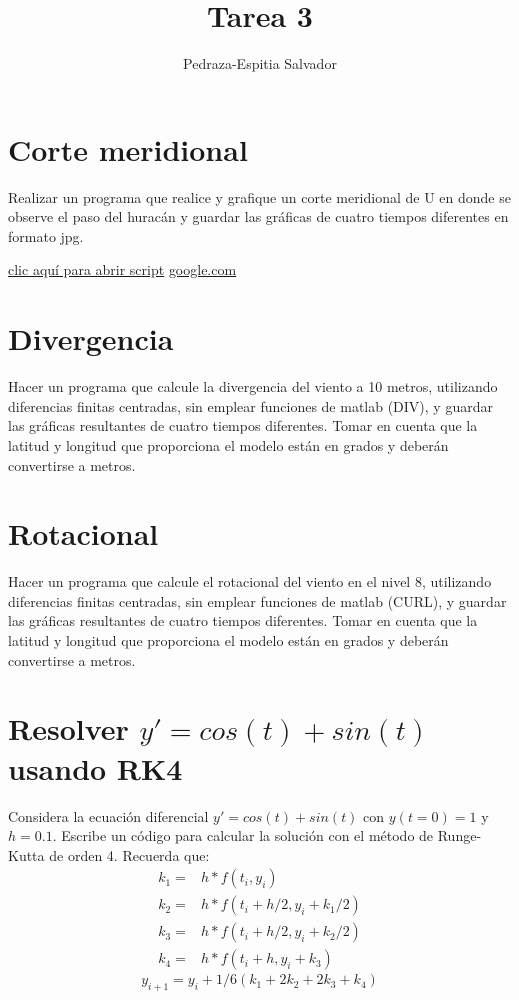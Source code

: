 \documentclass{article}
\title{Tarea 3}
\author{Pedraza-Espitia Salvador}
\date{}
\begin{document}
\maketitle

\section{Corte meridional}
Realizar un programa que realice y grafique un corte meridional de U en donde se observe el
paso del huracán y guardar las gráficas de cuatro tiempos diferentes en formato jpg.



\href{img.jpg}{clic aquí para abrir script}
\url{google.com}

\section{Divergencia}
Hacer un programa que calcule la divergencia del viento a 10 metros, utilizando diferencias
finitas centradas, sin emplear funciones de matlab (DIV), y guardar las gráficas resultantes de
cuatro tiempos diferentes. Tomar en cuenta que la latitud y longitud que proporciona el
modelo están en grados y deberán convertirse a metros.

\section{Rotacional}
Hacer un programa que calcule el rotacional del viento en el nivel 8, utilizando diferencias
finitas centradas, sin emplear funciones de matlab (CURL), y guardar las gráficas resultantes
de cuatro tiempos diferentes. Tomar en cuenta que la latitud y longitud que proporciona el
modelo están en grados y deberán convertirse a metros.

\section{Resolver \texorpdfstring{$y' = cos(t)+sin(t)$}{y' = cos(t)+ ...} usando RK4}
Considera la ecuación diferencial $y' = cos(t) +sin(t)$ con $y(t=0) = 1$ y $h=0.1$. Escribe un código
para calcular la solución con el método de Runge-Kutta de orden 4.
Recuerda que:
\begin{equation}
    \begin{split}
    k_1 = & h*f(t_i, y_i)\\
    k_2 = & h*f(t_i + h/2, y_i + k_1/2)\\
k_3 = & h*f(t_i + h/2, y_i + k_2/2)\\
k_4 = & h*f(t_i + h, y_i + k_3)
    \end{split}
\end{equation}
\begin{equation}
    y_{i+1} = y_i + 1/6(k_1 + 2k_2 + 2k_3 + k_4)
    \label{eq:rec}
\end{equation}
\end{document}
